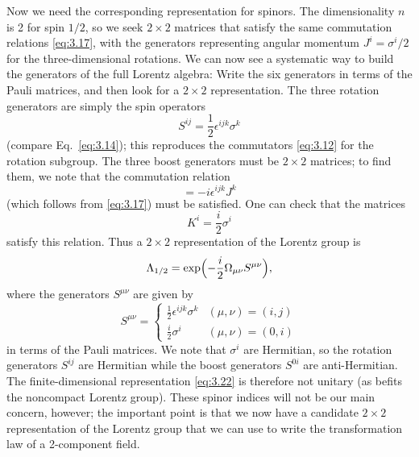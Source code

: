 Now we need the corresponding representation for spinors.  The dimensionality
$n$ is 2 for spin $1/2$, so we seek $2\times2$ matrices that satisfy the same
commutation relations \eqref{eq:3.17}, with the generators representing
angular momentum $J^i = \sigma^i/2$ for the three-dimensional rotations.  We
can now see a systematic way to build the generators of the full Lorentz
algebra: Write the six generators in terms of the Pauli matrices, and then
look for a $2\times2$ representation.  The three rotation generators are
simply the spin operators
\begin{equation}
  S^{ij} = \frac{1}{2}\epsilon^{ijk}\sigma^k
  \label{eq:3.20}
\end{equation}
(compare Eq.~\eqref{eq:3.14}); this reproduces the commutators
\eqref{eq:3.12} for the rotation subgroup.  The three boost generators must
be $2\times2$ matrices; to find them, we note that the commutation relation
\begin{equation}
  [K^i, K^j] = -i\epsilon^{ijk}J^k
\end{equation}
(which follows from \eqref{eq:3.17}) must be satisfied.  One can check that
the matrices
\begin{equation}
  K^i = \frac{i}{2}\sigma^i
  \label{eq:3.21}
\end{equation}
satisfy this relation.  Thus a $2\times2$ representation of the Lorentz group
is
\begin{equation}
  \Lambda_{1/2} = \exp\Bigl( -\frac{i}{2}\Omega_{\mu\nu}S^{\mu\nu} \Bigr),
  \label{eq:3.22}
\end{equation}
where the generators $S^{\mu\nu}$ are given by
\begin{equation}
  S^{\mu\nu} = \begin{cases}
    \frac{1}{2}\epsilon^{ijk}\sigma^k & (\mu,\nu)=(i,j)\\
    \frac{i}{2}\sigma^i & (\mu,\nu)=(0,i)
  \end{cases}
\end{equation}
in terms of the Pauli matrices.  We note that $\sigma^i$ are Hermitian, so
the rotation generators $S^{ij}$ are Hermitian while the boost generators
$S^{0i}$ are anti-Hermitian.  The finite-dimensional representation
\eqref{eq:3.22} is therefore not unitary (as befits the noncompact Lorentz
group).  These spinor indices will not be our main concern, however; the
important point is that we now have a candidate $2\times2$ representation of
the Lorentz group that we can use to write the transformation law of a
2-component field.

